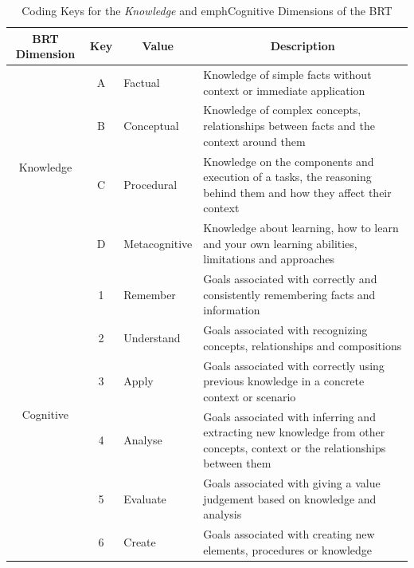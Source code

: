 \begin{table}[]
\caption{Coding Keys for the \emph{Knowledge} and emph{Cognitive} Dimensions of the BRT}
\begin{tabularx}{\textwidth}{@{}cclX@{}}
\toprule
\textbf{BRT   Dimension}   & \textbf{Key} & \multicolumn{1}{c}{\textbf{Value}} & \multicolumn{1}{c}{\textbf{Description}}                                                                                    \\ \midrule
\multirow{4}{*}{Knowledge} & A            & Factual                            & Knowledge of simple facts without context or immediate application                                                          \\ \cmidrule(l){2-4} 
                           & B            & Conceptual                         & Knowledge of complex concepts, relationships between facts and the context around them                                      \\ \cmidrule(l){2-4} 
                           & C            & Procedural                         & Knowledge on the components and execution of a tasks, the reasoning behind them and how they affect their context           \\ \cmidrule(l){2-4} 
                           & D            & Metacognitive                      & Knowledge about learning, how to learn and your own learning abilities, limitations and  approaches                         \\ \midrule
\multirow{6}{*}{Cognitive} & 1            & Remember                           & Goals associated with correctly and consistently remembering facts and information                                          \\ \cmidrule(l){2-4} 
                           & 2            & Understand                         & Goals associated with recognizing concepts, relationships and compositions                                                  \\ \cmidrule(l){2-4} 
                           & 3            & Apply                              & Goals associated with correctly using previous knowledge in a concrete context or scenario                                  \\ \cmidrule(l){2-4} 
                           & 4            & Analyse                            & Goals associated with inferring and extracting new knowledge from other concepts, context or the relationships between them \\ \cmidrule(l){2-4} 
                           & 5            & Evaluate                           & Goals associated with giving a value judgement based on knowledge and analysis                                              \\ \cmidrule(l){2-4} 
                           & 6            & Create                             & Goals associated with  creating new elements, procedures or knowledge                                                       \\ \bottomrule
\end{tabularx}
\label{tab:A-2}
\end{table}


